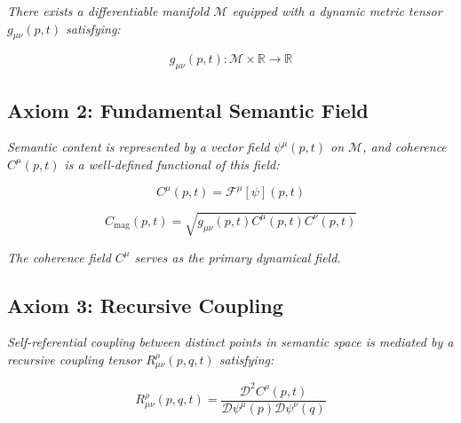 \textit{There exists a differentiable manifold \(\mathcal{M}\) equipped with a dynamic metric tensor \(g_{\mu\nu}(p,t)\) satisfying:}

\begin{equation}
g_{\mu\nu}(p,t) : \mathcal{M} \times \mathbb{R} \rightarrow \mathbb{R}
\end{equation}


\subsection{Axiom 2: Fundamental Semantic Field}
\label{1.2.2:axiom_2_fundamental_semantic_field}

\textit{Semantic content is represented by a vector field \(\psi^\mu(p,t)\) on \(\mathcal{M}\), and coherence \(C^\mu(p,t)\) is a well-defined functional of this field:}

\begin{equation}
C^\mu(p,t) = \mathcal{F}^\mu[\psi](p,t)
\end{equation}

\begin{equation}
C_{\text{mag}}(p,t) = \sqrt{g_{\mu\nu}(p,t) C^\mu(p,t) C^\nu(p,t)}
\end{equation}

\textit{The coherence field \(C^\mu\) serves as the primary dynamical field.}


\subsection{Axiom 3: Recursive Coupling}
\label{1.2.3:axiom_3_recursive_coupling}

\textit{Self-referential coupling between distinct points in semantic space is mediated by a recursive coupling tensor \(R^\rho_{\mu\nu}(p,q,t)\) satisfying:}

\begin{equation}
R^\rho_{\mu\nu}(p,q,t) = \frac{\mathcal{D}^2 C^\rho(p,t)}{\mathcal{D} \psi^\mu(p) \mathcal{D} \psi^\nu(q)}
\end{equation}


